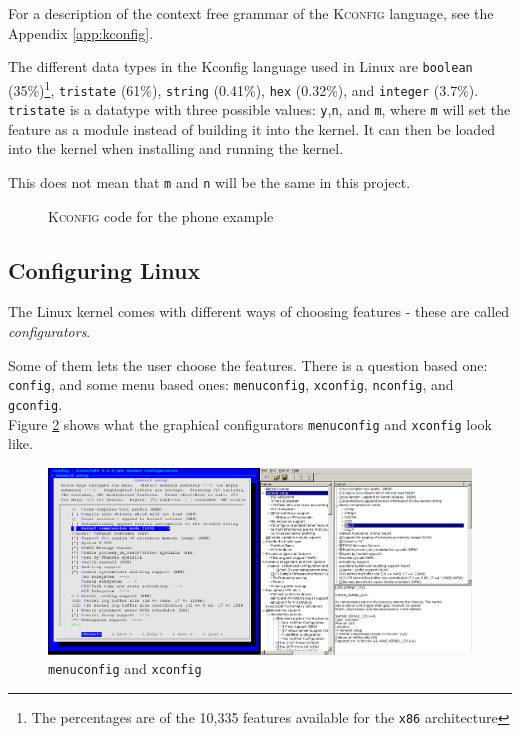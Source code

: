 \documentclass[a4paper,11pt]{report}
\newcommand{\f}{\footnote{\fn}}
\newcommand{\textcode}[1]{\fboxsep=1pt\texttt{\colorbox{gray!20}{#1}}}
\newcommand{\figa}{
    \begin{figure}[!htpb]
    \centering
}
\newcommand{\figb}[2]{
    \caption{#1}
    \label{#2}
    \end{figure}
}
\begin{document}
For a description of the context free grammar of 
the \textsc{Kconfig} language, see the Appendix \ref{app:kconfig}.
\\

            \def \fn {The percentages are of the 10,335 features available for 
                the \texttt{x86} architecture}

The different data types in the Kconfig language used in Linux are 
\textcode{boolean} (35\%)\f, 
\textcode{tristate} (61\%), \textcode{string} (0.41\%), \textcode{hex} 
(0.32\%), and \textcode{integer} (3.7\%). \texttt{tristate} is a datatype 
with three possible values: \texttt{y},\texttt{n}, and \texttt{m}, where 
\texttt{m} will set the feature as a module instead of building it into the 
kernel. It can then be loaded into the kernel when installing and running the 
kernel.

This does not mean that \texttt{m} and \texttt{n} will be the same in this 
project.




\figa
    \subfigure{
        
    }
\figb{\textsc{Kconfig} code for the phone example}{kconfigphone}

            \subsection{Configuring Linux}
            \label{sec:conf}

The Linux kernel comes with different ways of choosing features - these are 
called \emph{configurators}. 

Some of them lets the user choose the features. There is a question based 
one: \texttt{config}, and some menu based ones: \texttt{menuconfig}, 
\texttt{xconfig}, \texttt{nconfig}, and \texttt{gconfig}.
\\

Figure \ref{fig:lineofconfigs} shows what the graphical 
configurators \texttt{menuconfig} and 
\texttt{xconfig} look like.
\\


\figa
    \includegraphics[scale=0.25]{pngs/2configs.png}
\figb{\texttt{menuconfig} and \texttt{xconfig}}{fig:lineofconfigs}
\end{document}
